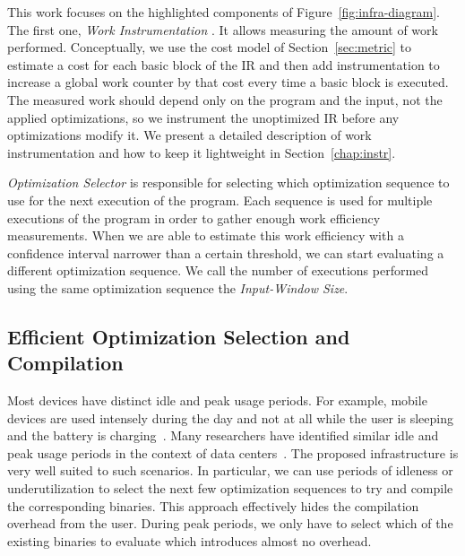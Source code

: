 This work focuses on the highlighted components of Figure~\ref{fig:infra-diagram}. The first one, \textit{Work Instrumentation} . It allows measuring the amount of work performed. Conceptually, we use the cost model of
Section~\ref{sec:metric} to estimate a cost for each basic block of the IR and then add instrumentation to increase a global work counter
by that cost every time a basic block is executed. The measured work should depend only on the program and the input, not the applied
optimizations, so we instrument the unoptimized IR before any optimizations modify it. We present a detailed description of work
instrumentation and how to keep it lightweight in Section~\ref{chap:instr}.

\textit{Optimization Selector} is responsible for selecting which optimization sequence to use for the next execution of the program. Each
sequence is used for multiple executions of the program in order to gather enough work efficiency measurements. When we are able to
estimate this work efficiency with a confidence interval narrower than a certain threshold, we can start evaluating a different
optimization sequence. We call the number of executions performed using the same optimization sequence the \textit{Input-Window Size}.


\subsection{Efficient Optimization Selection and Compilation}

Most devices have distinct idle and peak usage periods. For example, mobile devices are used intensely during the day and not at all while
the user is sleeping and the battery is charging~\citep{mpeis16}. Many researchers have identified similar idle and peak usage periods in
the context of data centers~\citep{armbrust10,chen12b}. The proposed \itercomp infrastructure is very well suited to such scenarios. In
particular, we can use periods of idleness or underutilization to select the next few optimization sequences to try and compile the
corresponding binaries. This approach effectively hides the compilation overhead from the user. During peak periods, we only have to select
which of the existing binaries to evaluate which introduces almost no overhead.
